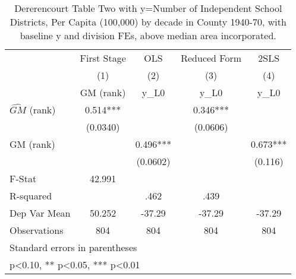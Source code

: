 \begin{table}[htbp]\centering
\def\sym#1{\ifmmode^{#1}\else\(^{#1}\)\fi}
\caption{Dererencourt Table Two with y=Number of Independent School Districts, Per Capita (100,000) by decade in County 1940-70, with baseline y and division FEs, above median area incorporated.}
\begin{tabular}{l*{4}{c}}
\toprule
                    & First Stage   &         OLS   &Reduced Form   &        2SLS   \\
                    &\multicolumn{1}{c}{(1)}&\multicolumn{1}{c}{(2)}&\multicolumn{1}{c}{(3)}&\multicolumn{1}{c}{(4)}\\
                    &\multicolumn{1}{c}{GM  (rank)}&\multicolumn{1}{c}{y\_L0}&\multicolumn{1}{c}{y\_L0}&\multicolumn{1}{c}{y\_L0}\\
\midrule
$\hat{GM}$ (rank)   &       0.514***&               &       0.346***&               \\
                    &    (0.0340)   &               &    (0.0606)   &               \\
\addlinespace
GM  (rank)          &               &       0.496***&               &       0.673***\\
                    &               &    (0.0602)   &               &     (0.116)   \\
\midrule
F-Stat              &      42.991   &               &               &               \\
R-squared           &               &        .462   &        .439   &               \\
Dep Var Mean        &      50.252   &      -37.29   &      -37.29   &      -37.29   \\
Observations        &         804   &         804   &         804   &         804   \\
\bottomrule
\multicolumn{5}{l}{\footnotesize Standard errors in parentheses}\\
\multicolumn{5}{l}{\footnotesize * p<0.10, ** p<0.05, *** p<0.01}\\
\end{tabular}
\end{table}
